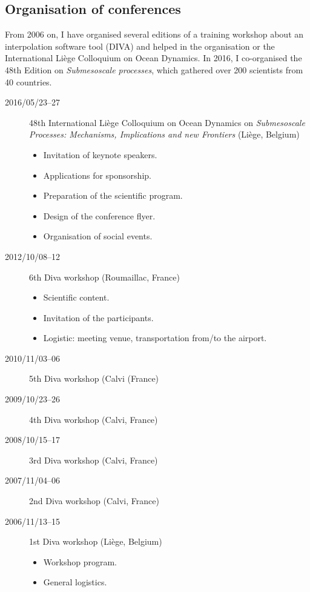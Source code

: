 \documentclass[11pt,a4paper,svgnames]{article}
\begin{document}
\subsection{Organisation of conferences}

\begin{summarybox}
From 2006 on, I have organised several editions of a training workshop about an interpolation software tool (DIVA) and helped in the organisation or the International Li\`{e}ge Colloquium on Ocean Dynamics. In 2016, I co-organised the 48th Edition on \textit{Submesoscale processes}, which gathered over 200 scientists from 40 countries.
\end{summarybox}

\begin{description}
\item[2016/05/23--27] 48th International Li\`{e}ge Colloquium on Ocean Dynamics on \textit{Submesoscale Processes: Mechanisms, Implications and new Frontiers} (Li\`{e}ge, Belgium)
\begin{itemize}
\item Invitation of keynote speakers.
\item Applications for sponsorship.
\item Preparation of the scientific program.
\item Design of the conference flyer.
\item Organisation of social events.
\end{itemize}

\item[2012/10/08--12] 6th Diva workshop (Roumaillac, France)
\begin{itemize}
\item Scientific content.
\item Invitation of the participants.
\item Logistic: meeting venue, transportation from/to the airport.
\end{itemize}

\item[2010/11/03--06] 5th Diva workshop (Calvi (France)
\item[2009/10/23--26] 4th Diva workshop (Calvi, France)
\item[2008/10/15--17] 3rd Diva workshop (Calvi, France)
\item[2007/11/04--06] 2nd Diva workshop (Calvi, France)
\item[2006/11/13--15] 1st Diva workshop (Li\`{e}ge, Belgium)
\begin{itemize}
\item Workshop program.
\item General logistics. 
\end{itemize}
\end{description}
\end{document}
